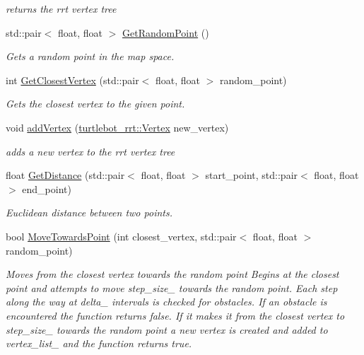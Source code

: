 \begin{DoxyCompactItemize}
\begin{DoxyCompactList}\small\item\em returns the rrt vertex tree \end{DoxyCompactList}\item 
std\+::pair$<$ float, float $>$ \hyperlink{classturtlebot__rrt_1_1RRTPlanner_a85eeb91e48f93df556e549be8d39a4ad}{Get\+Random\+Point} ()
\begin{DoxyCompactList}\small\item\em Gets a random point in the map space. \end{DoxyCompactList}\item 
int \hyperlink{classturtlebot__rrt_1_1RRTPlanner_a8379a32f6eae2b178b3f76982fa4f9f9}{Get\+Closest\+Vertex} (std\+::pair$<$ float, float $>$ random\+\_\+point)
\begin{DoxyCompactList}\small\item\em Gets the closest vertex to the given point. \end{DoxyCompactList}\item 
void \hyperlink{classturtlebot__rrt_1_1RRTPlanner_ab5be64444ba31b9ddcf2e1b134d0c5f8}{add\+Vertex} (\hyperlink{classturtlebot__rrt_1_1Vertex}{turtlebot\+\_\+rrt\+::\+Vertex} new\+\_\+vertex)
\begin{DoxyCompactList}\small\item\em adds a new vertex to the rrt vertex tree \end{DoxyCompactList}\item 
float \hyperlink{classturtlebot__rrt_1_1RRTPlanner_a5836b6fe15e2d33e753868b0f95f0c3f}{Get\+Distance} (std\+::pair$<$ float, float $>$ start\+\_\+point, std\+::pair$<$ float, float $>$ end\+\_\+point)
\begin{DoxyCompactList}\small\item\em Euclidean distance between two points. \end{DoxyCompactList}\item 
bool \hyperlink{classturtlebot__rrt_1_1RRTPlanner_a21e3230c57b811d41d87439aaad5d052}{Move\+Towards\+Point} (int closest\+\_\+vertex, std\+::pair$<$ float, float $>$ random\+\_\+point)
\begin{DoxyCompactList}\small\item\em Moves from the closest vertex towards the random point  Begins at the closest point and attempts to move step\+\_\+size\+\_\+ towards the random point. Each step along the way at delta\+\_\+ intervals is checked for obstacles. If an obstacle is encountered the function returns false. If it makes it from the closest vertex to step\+\_\+size\+\_\+ towards the random point a new vertex is created and added to vertex\+\_\+list\+\_\+ and the function returns true. \end{DoxyCompactList}\item 

\end{DoxyCompactItemize}
